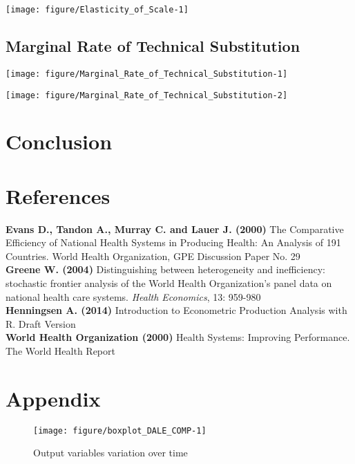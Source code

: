 \documentclass[12pt,a4paper]{article}\usepackage[]{graphicx}\usepackage[]{color}
\makeatletter
\def\maxwidth{ %
  \ifdim\Gin@nat@width>\linewidth
    \linewidth
  \else
    \Gin@nat@width
  \fi
}
\newenvironment{knitrout}{}{} %
\makeatother
\begin{document}
\texttt{[image: figure/Elasticity\_of\_Scale-1]} 

\subsection{Marginal Rate of Technical Substitution}


\texttt{[image: figure/Marginal\_Rate\_of\_Technical\_Substitution-1]} 

\texttt{[image: figure/Marginal\_Rate\_of\_Technical\_Substitution-2]} 



\section{Conclusion}



\newpage
\section{References}
\textbf{Evans D., Tandon A., Murray C. and Lauer J. (2000)} The Comparative Efficiency of National Health Systems in Producing Health: An Analysis of 191 Countries. World Health Organization, GPE Discussion Paper No. 29 \\

\textbf{Greene W. (2004)} Distinguishing between heterogeneity and inefficiency: stochastic frontier analysis of the World Health Organization's panel data on national health care systems. \textit{Health Economics}, 13: 959-980 \\

\textbf{Henningsen A. (2014)} Introduction to Econometric Production Analysis with R. Draft Version \\

\textbf{World Health Organization (2000)} Health Systems: Improving Performance. The World Health Report



\newpage
\section{Appendix}


\begin{knitrout}
\color{fgcolor}\begin{figure}[htbp]

{\centering \texttt{[image: figure/boxplot\_DALE\_COMP-1]} 

}

\caption[Output variables variation over time]{Output variables variation over time}\label{fig:boxplot_DALE_COMP}
\end{figure}


\end{knitrout}
\end{document}
